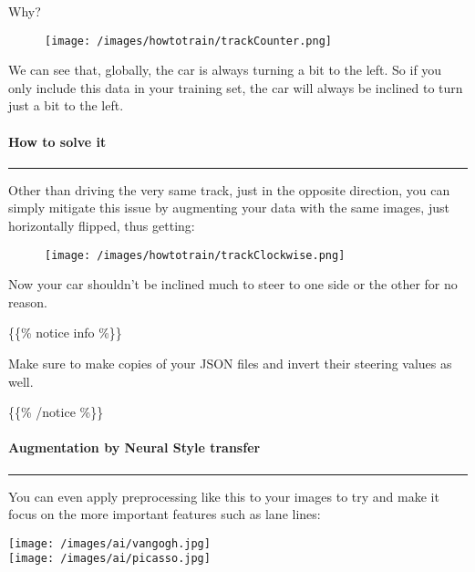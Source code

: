 \documentclass[
]{article}
\begin{document}
Why?

\begin{figure}
\centering
\texttt{[image: /images/howtotrain/trackCounter.png]}
\caption{}
\end{figure}

We can see that, globally, the car is always turning a bit to the left.
So if you only include this data in your training set, the car will
always be inclined to turn just a bit to the left.

\hypertarget{header-n124}{%
\paragraph{\texorpdfstring{\textbf{How to solve
it}}{How to solve it}}\label{header-n124}}

\begin{center}\rule{0.5\linewidth}{0.5pt}\end{center}

Other than driving the very same track, just in the opposite direction,
you can simply mitigate this issue by augmenting your data with the same
images, just horizontally flipped, thus getting:

\begin{figure}
\centering
\texttt{[image: /images/howtotrain/trackClockwise.png]}
\caption{}
\end{figure}

Now your car shouldn't be inclined much to steer to one side or the
other for no reason.

\{\{\% notice info \%\}\}

Make sure to make copies of your JSON files and invert their steering
values as well.

\{\{\% /notice \%\}\}

\hypertarget{header-n132}{%
\paragraph{\texorpdfstring{\textbf{Augmentation by Neural Style
transfer}}{Augmentation by Neural Style transfer}}\label{header-n132}}

\begin{center}\rule{0.5\linewidth}{0.5pt}\end{center}

You can even apply preprocessing like this to your images to try and
make it focus on the more important features such as lane lines:

\texttt{[image: /images/ai/vangogh.jpg]}\\
\texttt{[image: /images/ai/picasso.jpg]}
\end{document}
